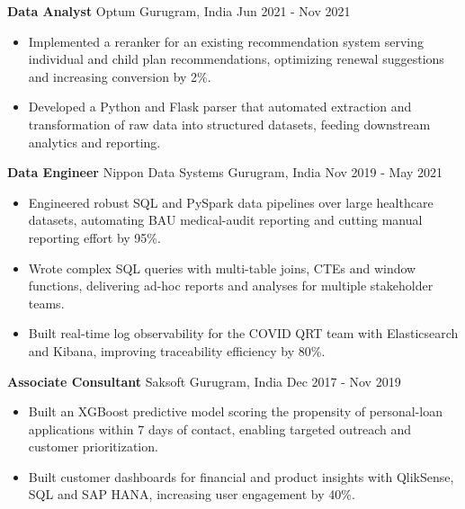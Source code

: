 \documentclass[10pt,a4paper]{article}
\newcommand{\role}[4]{\textbf{#1} \textbar{} #2 \hfill #3 \textbar{} #4\par}
\begin{document}
\vspace{3pt}
\role{Data Analyst}{Optum}{Gurugram, India}{Jun 2021 - Nov 2021}
\begin{itemize}
  \item Implemented a reranker for an existing recommendation system serving individual and child plan recommendations, optimizing renewal suggestions and increasing conversion by 2\%.
  \item Developed a Python and Flask parser that automated extraction and transformation of raw data into structured datasets, feeding downstream analytics and reporting.
\end{itemize}
\vspace{3pt}
\role{Data Engineer}{Nippon Data Systems}{Gurugram, India}{Nov 2019 - May 2021}
\begin{itemize}
  \item Engineered robust SQL and PySpark data pipelines over large healthcare datasets, automating BAU medical-audit reporting and cutting manual reporting effort by 95\%.
  \item Wrote complex SQL queries with multi-table joins, CTEs and window functions, delivering ad-hoc reports and analyses for multiple stakeholder teams.
  \item Built real-time log observability for the COVID QRT team with Elasticsearch and Kibana, improving traceability efficiency by 80\%.
\end{itemize}
\vspace{3pt}
\role{Associate Consultant}{Saksoft}{Gurugram, India}{Dec 2017 - Nov 2019}
\begin{itemize}
  \item Built an XGBoost predictive model scoring the propensity of personal-loan applications within 7 days of contact, enabling targeted outreach and customer prioritization.
  \item Built customer dashboards for financial and product insights with QlikSense, SQL and SAP HANA, increasing user engagement by 40\%.
\end{itemize}
\end{document}
